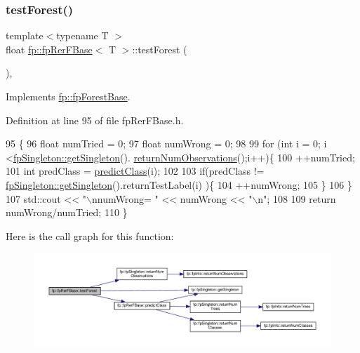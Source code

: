 \subsubsection{\texorpdfstring{test\+Forest()}{testForest()}}
{\footnotesize\ttfamily template$<$typename T $>$ \\
float \hyperlink{classfp_1_1fpRerFBase}{fp\+::fp\+Rer\+F\+Base}$<$ T $>$\+::test\+Forest (\begin{DoxyParamCaption}{ }\end{DoxyParamCaption})\hspace{0.3cm}{\ttfamily [inline]}, {\ttfamily [virtual]}}



Implements \hyperlink{classfp_1_1fpForestBase_af7becba028a198f650841b718d16ed16}{fp\+::fp\+Forest\+Base}.



Definition at line 95 of file fp\+Rer\+F\+Base.\+h.


\begin{DoxyCode}
95                               \{
96                 \textcolor{keywordtype}{float} numTried = 0;
97                 \textcolor{keywordtype}{float} numWrong = 0;
98 
99                 \textcolor{keywordflow}{for} (\textcolor{keywordtype}{int} i = 0; i <\hyperlink{classfp_1_1fpSingleton_a8bdae77b68521003e3fc630edec2e240}{fpSingleton::getSingleton}().
      \hyperlink{classfp_1_1fpSingleton_ae0a2963feb07b809b8740218f1048b67}{returnNumObservations}();i++)\{
100                     ++numTried;
101                     \textcolor{keywordtype}{int} predClass = \hyperlink{classfp_1_1fpRerFBase_a73ece66e774ad5f1a450f1422626947f}{predictClass}(i);
102 
103                     \textcolor{keywordflow}{if}(predClass != \hyperlink{classfp_1_1fpSingleton_a8bdae77b68521003e3fc630edec2e240}{fpSingleton::getSingleton}().returnTestLabel(i)
      )\{
104                         ++numWrong;
105                     \}
106                 \}
107                 std::cout << \textcolor{stringliteral}{"\(\backslash\)nnumWrong= "} << numWrong << \textcolor{stringliteral}{"\(\backslash\)n"};
108 
109                 \textcolor{keywordflow}{return} numWrong/numTried;
110             \}
\end{DoxyCode}
Here is the call graph for this function\+:
\nopagebreak
\begin{figure}[H]
\begin{center}
\leavevmode
\includegraphics[width=350pt]{classfp_1_1fpRerFBase_a0ea48ea24a8213e49e18b6f24ab45508_cgraph}
\end{center}
\end{figure}
\mbox{\label{classfp_1_1fpRerFBase_ad9983abf38c0cb799ed490129508d42e}} 
